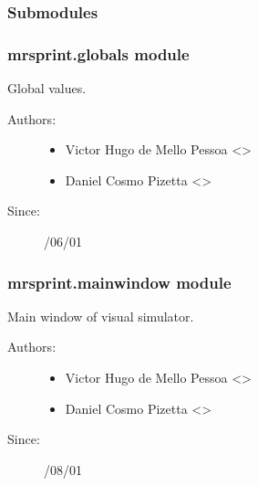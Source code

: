 \documentclass[a4paper,10pt,english]{sphinxmanual}
\begin{document}
\subsubsection{Submodules}
\label{\detokenize{autodoc/mrsprint/mrsprint:submodules}}

\subsubsection{mrsprint.globals module}
\label{\detokenize{autodoc/mrsprint/mrsprint:module-mrsprint.globals}}\label{\detokenize{autodoc/mrsprint/mrsprint:mrsprint-globals-module}}
Global values.
\begin{description}
\item[{Authors:}] \leavevmode\begin{itemize}
\item {} 
Victor Hugo de Mello Pessoa \textless{}\textgreater{}

\item {} 
Daniel Cosmo Pizetta \textless{}\textgreater{}

\end{itemize}

\item[{Since:}] /06/01

\end{description}


\subsubsection{mrsprint.mainwindow module}
\label{\detokenize{autodoc/mrsprint/mrsprint:module-mrsprint.mainwindow}}\label{\detokenize{autodoc/mrsprint/mrsprint:mrsprint-mainwindow-module}}
Main window of visual simulator.
\begin{description}
\item[{Authors:}] \leavevmode\begin{itemize}
\item {} 
Victor Hugo de Mello Pessoa \textless{}\textgreater{}

\item {} 
Daniel Cosmo Pizetta \textless{}\textgreater{}

\end{itemize}

\item[{Since:}] /08/01

\end{description}
\end{document}
